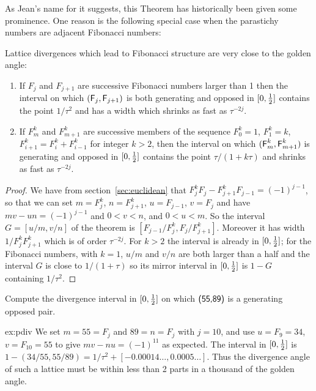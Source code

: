 %
As Jean's name for it suggests, this Theorem has historically been given some prominence. One reason is the following special case when the parastichy numbers are adjacent Fibonacci numbers:
\begin{theorem}
	Lattice divergences which lead to Fibonacci structure are very close to the golden angle:
	\begin{enumerate}
\item
	If $F_j$ and $F_{j+1}$ are successive Fibonacci numbers larger than 1 then the interval on which $({\textsf F}_j,{\textsf F}_{j+1})$ is both generating and opposed in $[0,\textstyle{\frac{1}{2}}]$  contains the point $1/\tau^2$ and has a width 
	 which shrinks as fast as $\tau^{-2j}$.
\item 
If $F^k_m$ and $F^k_{m+1}$ are successive members of the sequence $F^k_0=1$, $F^k_1=k$, $F^k_{i+1}=F^k_i+F^k_{i-1}$ for integer $k>2$, then 
	the interval on which $({\textsf F}^k_m,{\textsf F}^k_{m+1})$ is generating and opposed in  $[0,\textstyle{\frac{1}{2}}]$ contains the point $\tau/(1+k\tau)$ and shrinks as fast as  $\tau^{-2j}$.
\end{enumerate}
\end{theorem}
\begin{proof}
	We have from section~\ref{sec:euclidean} that $F^{k}_j F_j-F^{k}_{j+1}F_{j-1}=(-1)^{j-1}$, so that we can set $m=F^{k}_j$, $n=F^{k}_{j+1}$, $u=F_{j-1}$, $v=F_{j}$ and have $mv-un=(-1)^{j-1}$ and $0<v<n$, and $0<u<m$. 
	So the interval $G=[u/m,v/n]$ of the theorem is $[F_{j-1}/F^k_{j},F_j/F^k_{j+1}]$.
	Moreover it has width $1/F^k_jF^{k}_{j+1}$ which is of order $\tau^{-2j}$.
	For $k>2$ the interval is already in $[0,\textstyle{\frac{1}{2}}]$; for the Fibonacci numbers, with $k=1$, $u/m$ and $v/n$ are both larger than a half and the interval $G$ is close to $1/(1+\tau)$ so its mirror 
	 interval in $[0,\textstyle{\frac{1}{2}}]$ is  
	$1-G$ containing $1/\tau^2$. 
\end{proof}
\begin{jExercise}\label{ex:pdiv}
	Compute the divergence interval in $[0,\textstyle{\frac{1}{2}}]$ on which  $\textsf{(55,89)}$ is a generating opposed pair.
\end{jExercise}
\begin{jAnswer}{ex:pdiv}{
	We set $m=55=F_j$ and $89=n=F_j$ with $j=10$, and use $u=F_9=34$, $v=F_{10}=55$ to give $mv-nu=(-1)^{11}$ as expected.
	The interval in $[0,\textstyle{\frac{1}{2}}]$ is $1-(34/55,55/89)= 1/\tau^2+ [-0.00014\ldots, 0.0005\ldots]$.
	Thus the divergence angle of such a lattice must be within less than 2 parts in a thousand of the golden angle.
} 
\end{jAnswer}

